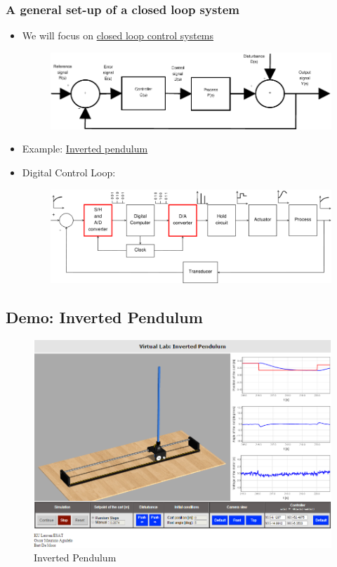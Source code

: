 \begin{frame}
	\frametitle{A general set-up of a closed loop system}
	\vspace*{-1em}
	\begin{itemize}
		\item We will focus on \underline{closed loop control systems}
		\begin{figure}
\centering
\includegraphics[width=0.7\linewidth]{Closed-Loop}
\label{fig:Closed-Loop}
\end{figure}
\item Example: \href{http://homes.esat.kuleuven.be/~magudelo/_html5/test11.html}{Inverted pendulum}

\item Digital Control Loop:
\begin{figure}
\centering
\includegraphics[width=0.6\linewidth]{digital-control-system}
\label{fig:digital-control-system}
\end{figure}

	\end{itemize}
\end{frame}

\subsection[Demo: Inverted Pendulum]{Demo: Inverted Pendulum}
\begin{frame}
	\begin{figure}
\centering
\includegraphics[width=0.7\linewidth]{"Inverted Pendulum"}
\caption{Inverted Pendulum}
\label{fig:InvertedPendulum}
\end{figure}
\end{frame}

